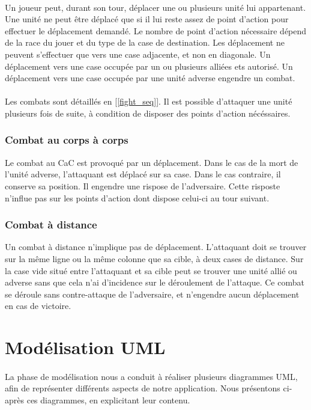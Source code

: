 \documentclass[a4paper]{article}
\begin{document}
\paragraph{}
Un joueur peut, durant son tour, déplacer une ou plusieurs unité lui appartenant. Une unité ne peut être déplacé que si il lui reste assez de point d'action pour effectuer le déplacement demandé. Le nombre de point d'action nécessaire dépend de la race du jouer et du type de la case de destination. Les déplacement ne peuvent s'effectuer que vers une case adjacente, et non en diagonale. Un déplacement vers une case occupée par un ou plusieurs alliées ets autorisé. Un déplacement vers une case occupée par une unité adverse engendre un combat.

\paragraph{}
Les combats sont détaillés en [\ref{fight_seq}]. Il est possible d'attaquer une unité plusieurs fois de suite, à condition de disposer des points d'action nécéssaires.
\subsubsection{Combat au corps à corps}
Le combat au CaC est provoqué par un déplacement. Dans le cas de la mort de l'unité adverse, l'attaquant est déplacé sur sa case. Dans le cas contraire, il conserve sa position.
Il engendre une rispose de l'adversaire. Cette risposte n'influe pas sur les points d'action dont dispose celui-ci au tour suivant.
\subsubsection{Combat à distance}
Un combat à distance n'implique pas de déplacement. L'attaquant doit se trouver sur la même ligne ou la même colonne que sa cible, à deux cases de distance. Sur la case vide situé entre l'attaquant et sa cible peut se trouver une unité allié ou adverse sans que cela n'ai d'incidence sur le déroulement de l'attaque.
Ce combat se déroule sans contre-attaque de l'adversaire, et n'engendre aucun déplacement en cas de victoire. 
\section{Modélisation UML}
\paragraph{}
La phase de modélisation nous a conduit à réaliser plusieurs diagrammes UML, afin de représenter différents aspects de notre application. Nous présentons ci-après ces diagrammes, en explicitant leur contenu.
\end{document}
